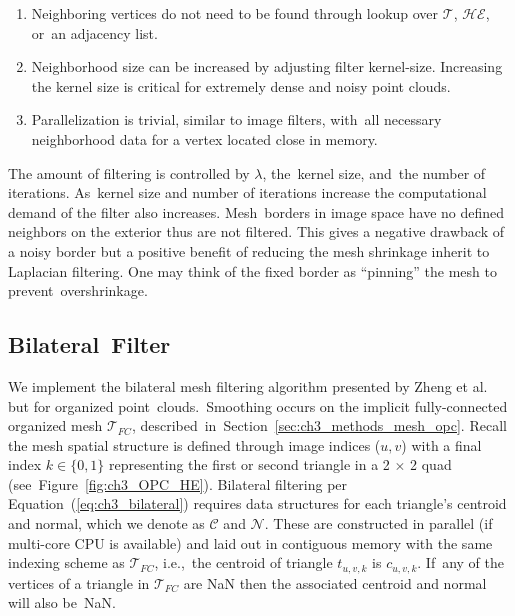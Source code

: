 \begin{enumerate}
    \item Neighboring vertices do not need to be found through lookup over $\mathcal{T}$, $\mathcal{HE}$, or~an adjacency list. 
    \item Neighborhood size can be increased by adjusting filter kernel-size. Increasing the kernel size is critical for extremely dense and noisy point clouds.
    \item Parallelization is trivial, similar to image filters, with~all necessary neighborhood data for a vertex located close in memory.
\end{enumerate}

The amount of filtering is controlled by $\lambda$, the~kernel size, and~the number of iterations. As~kernel size and number of iterations increase the computational demand of the filter also increases. Mesh~borders in image space have no defined neighbors on the exterior thus are not filtered. This gives a negative drawback of a noisy border but a positive benefit of reducing the mesh shrinkage inherit to Laplacian filtering. One may think of the fixed border as ``pinning'' the mesh to prevent~overshrinkage. 


\subsection{Bilateral~Filter}\label{sec:ch3_methods_mesh_smoothing_bilateral}

We implement the bilateral mesh filtering algorithm presented by Zheng et al.~\cite{zheng_bilateral_2011} but for organized point~clouds.~Smoothing occurs on the implicit fully-connected organized mesh $\mathcal{T}_{FC}$, described~in~Section~\ref{sec:ch3_methods_mesh_opc}.  Recall the mesh spatial structure is defined through image indices ($u,v$) with a final index $k \in \{0,1\}$ representing the first or second triangle in a 2 $\times$ 2 quad (see~Figure~\ref{fig:ch3_OPC_HE}). Bilateral filtering per Equation~(\ref{eq:ch3_bilateral}) requires data structures for each triangle's centroid and normal, which we denote as $\mathcal{C}$ and $\mathcal{N}$. These are constructed in parallel (if multi-core CPU is available) and laid out in contiguous memory with the same indexing scheme as $\mathcal{T}_{FC}$, i.e.,~the centroid of triangle $t_{u,v,k}$ is $c_{u,v,k}$. If~any of the vertices of a triangle in $\mathcal{T}_{FC}$  are NaN then the associated centroid and normal will also be~NaN.

